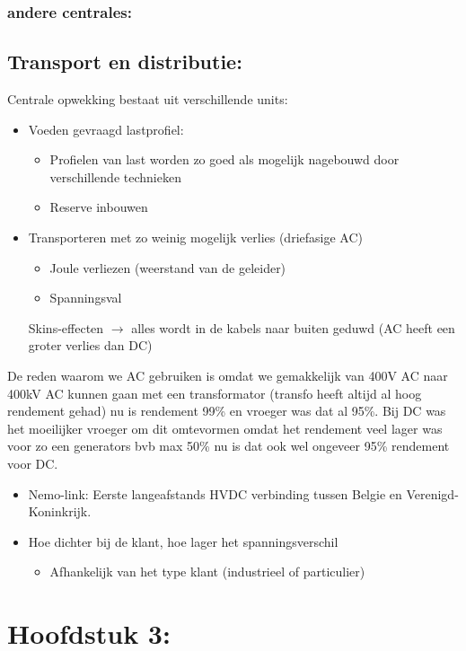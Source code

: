 \documentclass[12pt]{article}
\begin{document}
\subsubsection{andere centrales:}
\subsection{Transport en distributie:}
Centrale opwekking bestaat uit verschillende units:\begin{itemize}
    \item Voeden gevraagd lastprofiel:\begin{itemize}
        \item Profielen van last worden zo goed als mogelijk nagebouwd door verschillende technieken
        \item Reserve inbouwen
    \end{itemize}
    \item Transporteren met zo weinig mogelijk verlies (driefasige AC)\begin{itemize}
        \item Joule verliezen (weerstand van de geleider)
        \item Spanningsval
    \end{itemize}
Skins-effecten $\rightarrow$ alles wordt in de kabels naar buiten geduwd (AC heeft een groter verlies dan DC)
\end{itemize}
De reden waarom we AC gebruiken is omdat we gemakkelijk van 400V AC naar 400kV AC kunnen gaan met een transformator (transfo heeft altijd al hoog rendement gehad) nu is rendement 99\% en vroeger was dat al 95\%. Bij DC was het moeilijker vroeger om dit omtevormen omdat het rendement veel lager was voor zo een generators bvb max 50\% nu is dat ook wel ongeveer 95\% rendement voor DC.
\begin{itemize}
    \item Nemo-link: Eerste langeafstands HVDC verbinding tussen Belgie en Verenigd-Koninkrijk.
\end{itemize}
\begin{itemize}
    \item Hoe dichter bij de klant, hoe lager het spanningsverschil\begin{itemize}
        \item Afhankelijk van het type klant (industrieel of particulier)
    \end{itemize}
\end{itemize}
\section{Hoofdstuk 3:}
\end{document}
